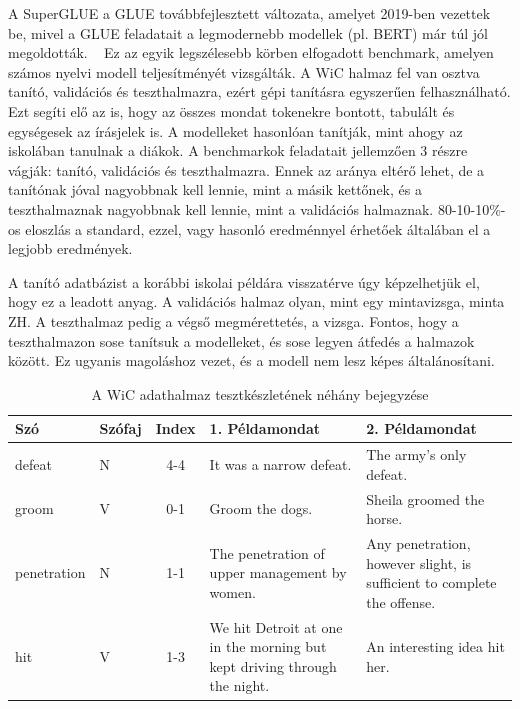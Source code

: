 \documentclass[12pt]{report}
\theoremstyle{definition}
\begin{document}
A SuperGLUE a GLUE továbbfejlesztett változata, amelyet 2019-ben vezettek be, mivel a GLUE feladatait a legmodernebb modellek (pl. BERT) már túl jól megoldották. ~\cite{wang2020superglue}
Ez az egyik legszélesebb körben elfogadott benchmark, amelyen számos nyelvi modell teljesítményét vizsgálták.
A WiC halmaz fel van osztva tanító, validációs és teszthalmazra, ezért gépi tanításra egyszerűen felhasználható. Ezt segíti elő az is, hogy az összes mondat tokenekre bontott, tabulált és egységesek az írásjelek is.
A modelleket hasonlóan tanítják, mint ahogy az iskolában tanulnak a diákok.
A benchmarkok feladatait jellemzően 3 részre vágják:
tanító, validációs és teszthalmazra. Ennek az aránya eltérő lehet, de a tanítónak jóval nagyobbnak kell lennie, mint a másik kettőnek, és a teszthalmaznak nagyobbnak kell lennie, mint a validációs halmaznak. 80-10-10\%-os eloszlás a standard, ezzel, vagy hasonló eredménnyel érhetőek általában el a legjobb eredmények.

A tanító adatbázist a korábbi iskolai példára visszatérve úgy képzelhetjük el, hogy ez a leadott anyag. A validációs halmaz olyan, mint egy mintavizsga, minta ZH. A teszthalmaz pedig a végső megmérettetés, a vizsga. Fontos, hogy a teszthalmazon sose tanítsuk a modelleket, és sose legyen átfedés a halmazok között. Ez ugyanis magoláshoz vezet, és a modell nem lesz képes általánosítani.

\begin{table}[H]
    \centering
    \caption{A WiC adathalmaz tesztkészletének néhány bejegyzése}
    \label{tbl:wic_peldak} %
    \begin{tabular}{llcp{}p{}} %
        \hline
        \textbf{Szó} & \textbf{Szófaj} & \textbf{Index} & \textbf{1. Példamondat} & \textbf{2. Példamondat} \\
        \hline
        defeat      & N      & 4-4       & It was a narrow defeat.                             & The army's only defeat.                                             \\
        groom       & V      & 0-1       & Groom the dogs.                                     & Sheila groomed the horse.                                            \\
        penetration & N      & 1-1       & The penetration of upper management by women.       & Any penetration, however slight, is sufficient to complete the offense. \\
        hit         & V      & 1-3       & We hit Detroit at one in the morning but kept driving through the night. & An interesting idea hit her.                                         \\
        \hline
    \end{tabular}
\end{table}
\end{document}
